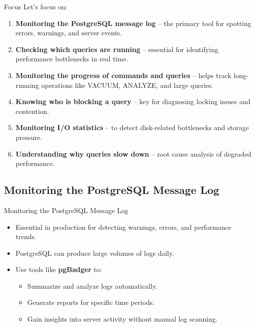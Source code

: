 \documentclass[aspectratio=169]{beamer}
\begin{document}
\begin{frame}{Focus}
    Let's focus on:
    \begin{enumerate}
        \item \textbf{Monitoring the PostgreSQL message log} – the primary tool for spotting errors, warnings, and server events.

        \item \textbf{Checking which queries are running} – essential for identifying performance bottlenecks in real time.

        \item \textbf{Monitoring the progress of commands and queries} – helps track long-running operations like VACUUM, ANALYZE, and large queries.

        \item \textbf{Knowing who is blocking a query} – key for diagnosing locking issues and contention.

        \item \textbf{Monitoring I/O statistics} – to detect disk-related bottlenecks and storage pressure.

        \item \textbf{Understanding why queries slow down} – root cause analysis of degraded performance.
    \end{enumerate}
\end{frame}

\subsection{Monitoring the PostgreSQL Message Log}

\begin{frame}{Monitoring the PostgreSQL Message Log}
\begin{itemize}
    \item Essential in production for detecting warnings, errors, and performance trends.
    \item PostgreSQL can produce large volumes of logs daily.
    \item Use tools like \textbf{pgBadger} to:
    \begin{itemize}
        \item Summarize and analyze logs automatically.
        \item Generate reports for specific time periods.
        \item Gain insights into server activity without manual log scanning.
    \end{itemize}
\end{itemize}
\end{frame}
\end{document}
